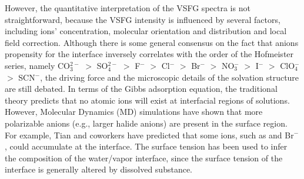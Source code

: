 However, the quantitative interpretation of the VSFG spectra is not straightforward,
because the VSFG intensity is influenced by several factors, including ions' concentration, 
molecular orientation and distribution and local field correction\cite{Morita2008}.
Although there is some general consensus on the fact that anions propensity for the interface inversely correlates with
the order of the Hofmeister series, namely 
CO$_3^{2-}$ $>$  SO$_4^{2-}$ $>$ F$^-$ $>$ Cl$^-$ $>$ Br$^-$ $>$ NO$_3^-$ $>$ I$^-$ $>$ ClO$_4^-$ $>$ SCN$^-$\cite{PJ06,ZYJ10,DT08,Parsons2011},
the driving force and the microscopic details of the solvation structure are still debated. 
In terms of the Gibbs adsorption equation, the traditional theory predicts that 
no atomic ions will exist at interfacial regions of solutions. However, 
Molecular Dynamics (MD) simulations have shown that more polarizable anions (e.g., larger halide anions) are present in the surface region\cite{Jungwirth2001,Jungwirth2002}. 
For example, Tian and coworkers\cite{CST11} have predicted that some ions, such as \I and Br$^{-}$, could accumulate at the interface.
The surface tension has been used to infer the composition of the water/vapor interface, 
since the surface tension of the interface is generally altered by dissolved substance\cite{PJ02}.


